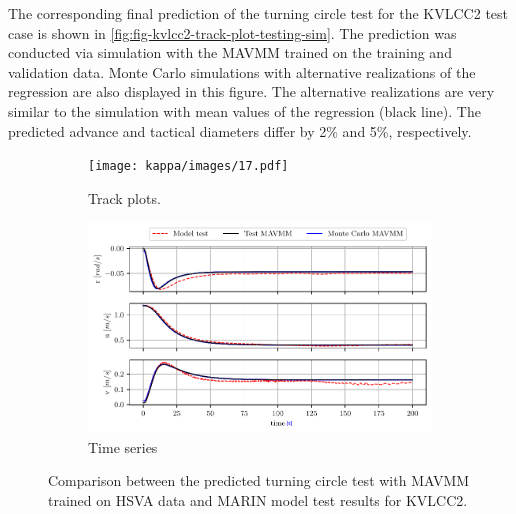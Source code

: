The corresponding final prediction of the turning circle test for the KVLCC2 test case is shown in \autoref{fig:fig-kvlcc2-track-plot-testing-sim}. The prediction was conducted via simulation with the MAVMM trained on the training and validation data. Monte Carlo simulations with alternative realizations of the regression are also displayed in this figure. The alternative realizations are very similar to the simulation with mean values of the regression (black line).
The predicted advance and tactical diameters differ by 2\% and 5\%, respectively.
\begin{figure}[h]
    \centering

    \begin{subfigure}[b]{0.80\textwidth}
        \texttt{[image: kappa/images/17.pdf]}
        \caption{Track plots.}
    \end{subfigure}
    \vfill
    \begin{subfigure}[b]{0.80\textwidth}
        \includegraphics[width=\textwidth]{kappa/images/18.pdf}
        \caption{Time series}
    \end{subfigure}
        
    \caption{Comparison between the predicted turning circle test with MAVMM trained on HSVA data and MARIN model test results for KVLCC2.}
    \label{fig:fig-kvlcc2-track-plot-testing-sim}
\end{figure}